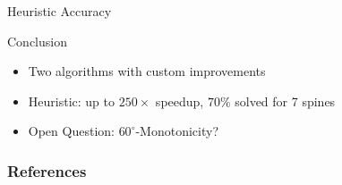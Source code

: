 \documentclass[aspectratio=169,notes]{beamer}
\begin{document}
\begin{frame}{Heuristic Accuracy}

\begin{figure}
    \centering %
    \scalebox{1}{}
\end{figure}

\end{frame}

\begin{frame}{Conclusion}

\begin{itemize}
\item Two algorithms with custom improvements
\item Heuristic: up to $250\times$ speedup, $70\%$ solved for 7 spines
\item Open Question: $60^{\circ}$-Monotonicity?
\end{itemize}

\makebox[0pt][l]{%
  \raisebox{-80pt}[0pt][0pt]{\hspace*{130pt}%
    \scalebox{.1}{}}}%


\end{frame}

\begin{frame}[allowframebreaks]
        \frametitle{References}
        
\AtNextBibliography{\footnotesize}
        \printbibliography
\end{frame}
\end{document}
